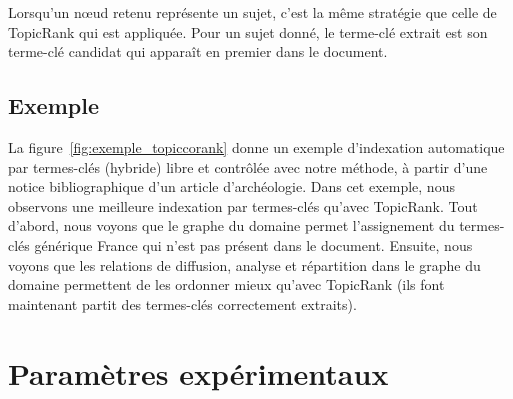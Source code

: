     Lorsqu'un n\oe{}ud retenu représente un sujet, c'est la même stratégie
    que celle de Topic\-Rank qui est appliquée. Pour un sujet donné, le
    terme-clé extrait est son terme-clé candidat qui apparaît en premier
    dans le document.

  \subsection{Exemple}
  \label{subsec:main-domain_specific_keyphrase_annotation-supervised_automatic_keyphrase_extraction-topiccorank-exemple}
    La figure~\ref{fig:exemple_topiccorank} donne un exemple d'indexation
    automatique par termes-clés (hybride) libre et contrôlée avec notre méthode, à partir d'une notice
    bibliographique d'un article d'archéologie. Dans cet exemple, nous observons
    une meilleure indexation par termes-clés qu'avec TopicRank. Tout d'abord,
    nous voyons que le graphe du domaine permet l'assignement du termes-clés
    générique \og{}France\fg{} qui n'est pas présent dans le document. Ensuite,
    nous voyons que les relations de \og{}diffusion\fg{}, \og{}analyse\fg{} et
    \og{}répartition\fg{} dans le graphe du domaine permettent de les ordonner
    mieux qu'avec TopicRank (ils font maintenant partit des termes-clés
    correctement extraits).
    

\section{Paramètres expérimentaux}
\label{sec:main-domain_specific_keyphrase_annotation-supervised_automatic_keyphrase_annotation-evaluation}
